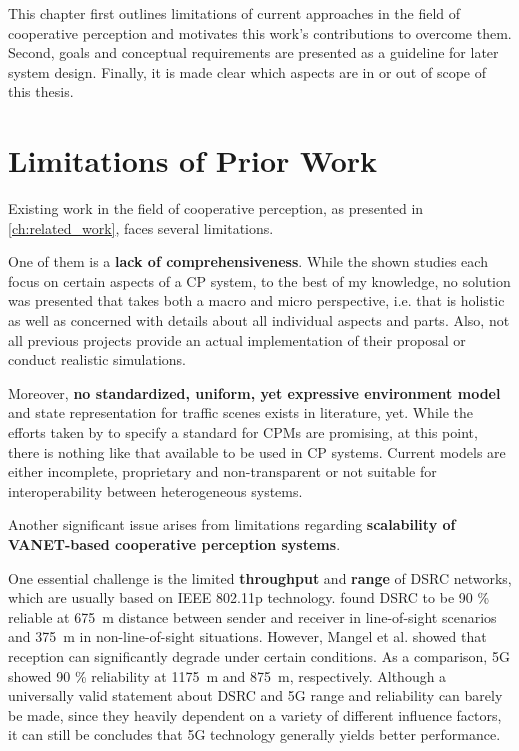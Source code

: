 This chapter first outlines limitations of current approaches in the field of cooperative perception and motivates this work's contributions to overcome them. Second, goals and conceptual requirements are presented as a guideline for later system design. Finally, it is made clear which aspects are in or out of scope of this thesis.

\section{Limitations of Prior Work}
\label{sec:problem_analysis:limitations_of_prior_work}

Existing work in the field of cooperative perception, as presented in \cref{ch:related_work}, faces several limitations.
\par
\bigskip

One of them is a \textbf{lack of comprehensiveness}. While the shown studies each focus on certain aspects of a CP system, to the best of my knowledge, no solution was presented that takes both a macro and micro perspective, i.e. that is holistic as well as concerned with details about all individual aspects and parts. Also, not all previous projects provide an actual implementation of their proposal or conduct realistic simulations.
\par
\bigskip

Moreover, \textbf{no standardized, uniform, yet expressive environment model} and state representation for traffic scenes exists in literature, yet. While the efforts taken by \cite{EuropeanTelecommunicationsStandardsInstituteETSI2019} to specify a standard for CPMs are promising, at this point, there is nothing like that available to be used in CP systems. Current models are either incomplete, proprietary and non-transparent or not suitable for interoperability between heterogeneous systems. 
\par
\bigskip

Another significant issue arises from limitations regarding \textbf{scalability of VANET-based cooperative perception systems}.

One essential challenge is the limited \textbf{throughput} and \textbf{range} of DSRC networks, which are usually based on IEEE 802.11p technology. \cite{5GAutomotiveAssociation2018} found DSRC to be 90 \% reliable at \SI{675}{\meter} distance between sender and receiver in line-of-sight scenarios and \SI{375}{\meter} in non-line-of-sight situations. However, Mangel et al. \cite{Mangel2011} showed that reception can significantly degrade under certain conditions. As a comparison, 5G showed 90 \% reliability at \SI{1175}{\meter} and \SI{875}{\meter}, respectively. Although a universally valid statement about DSRC and 5G range and reliability can barely be made, since they heavily dependent on a variety of different influence factors, it can still be concludes that 5G technology generally yields better performance.

